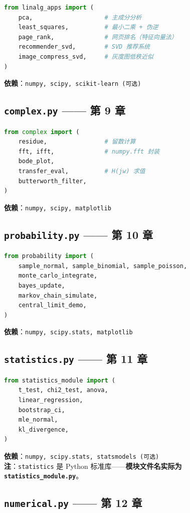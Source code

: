 \begin{lstlisting}[language=Python]
from linalg_apps import (
    pca,                    # 主成分分析
    least_squares,          # 最小二乘 + 伪逆
    page_rank,              # 网页排名（特征向量法）
    recommender_svd,        # SVD 推荐系统
    image_compress_svd,     # 灰度图低秩近似
)
\end{lstlisting}
\textbf{依赖}：\texttt{numpy, scipy, scikit-learn (可选)}

\subsection{\texttt{complex.py} —— 第 9 章}

\begin{lstlisting}[language=Python]
from complex import (
    residue,                # 留数计算
    fft, ifft,              # numpy.fft 封装
    bode_plot,
    transfer_eval,          # H(jw) 求值
    butterworth_filter,
)
\end{lstlisting}
\textbf{依赖}：\texttt{numpy, scipy, matplotlib}

\subsection{\texttt{probability.py} —— 第 10 章}

\begin{lstlisting}[language=Python]
from probability import (
    sample_normal, sample_binomial, sample_poisson,
    monte_carlo_integrate,
    bayes_update,
    markov_chain_simulate,
    central_limit_demo,
)
\end{lstlisting}
\textbf{依赖}：\texttt{numpy, scipy.stats, matplotlib}

\subsection{\texttt{statistics.py} —— 第 11 章}

\begin{lstlisting}[language=Python]
from statistics_module import (
    t_test, chi2_test, anova,
    linear_regression,
    bootstrap_ci,
    mle_normal,
    kl_divergence,
)
\end{lstlisting}
\textbf{依赖}：\texttt{numpy, scipy.stats, statsmodels (可选)}\\
\textbf{注}：\texttt{statistics} 是 Python 标准库——\textbf{模块文件名实际为 \texttt{statistics\_module.py}}。

\subsection{\texttt{numerical.py} —— 第 12 章}


